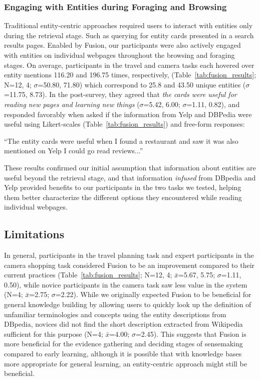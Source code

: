 \subsubsection{Engaging with Entities during Foraging and Browsing}
Traditional entity-centric approaches required users to interact with entities only during the retrieval stage. Such as querying for entity cards presented in a search results pages. Enabled by Fusion, our participants were also actively engaged with entities on individual webpages throughout the browsing and foraging stages. On average, participants in the travel and camera tasks each hovered over entity mentions 116.20 and 196.75 times, respectively, (Table~\ref{tab:fusion_results}; N=12, 4; $\sigma$=50.80, 71.80) which correspond to 25.8 and 43.50 unique entities ($\sigma$=11.75, 8.73). In the post-survey, they agreed that \emph{the cards were useful for reading new pages and learning new things} ($\sigma$=5.42, 6.00; $\sigma$=1.11, 0.82),
and responded favorably when asked if the information from Yelp and DBPedia were useful using Likert-scales (Table~\ref{tab:fusion_results}) and free-form responses:

\begin{tightquote}
``The entity cards were useful when I found a restaurant and saw it was also mentioned on Yelp I could go read reviews...''
\end{tightquote}

\noindent These results confirmed our initial assumption that information about entities are useful beyond the retrieval stage, and that information \emph{infused} from DBpedia and Yelp provided benefits to our participants in the two tasks we tested, helping them better characterize the different options they encountered while reading individual webpages. 



\subsection{Limitations}
In general, participants in the travel planning task and expert participants in the camera shopping task considered Fusion to be an improvement compared to their current practices (Table~\ref{tab:fusion_results}; N=12, 4; $\bar{x}$=5.67, 5.75; $\sigma$=1.11, 0.50),
while novice participants in the camera task saw less value in the system (N=4; $\bar{x}$=2.75; $\sigma$=2.22).
While we originally expected Fusion to be beneficial for general knowledge building by allowing users to quickly look up the definition of unfamiliar terminologies and concepts using the entity descriptions from DBpedia, novices did not find the short description extracted from Wikipedia sufficient for this purpose (N=4; $\bar{x}$=4.00; $\sigma$=2.45). This suggests that Fusion is more beneficial for the evidence gathering and deciding stages of sensemaking compared to early learning, although it is possible that with knowledge bases more appropriate for general learning, an entity-centric approach might still be beneficial.

